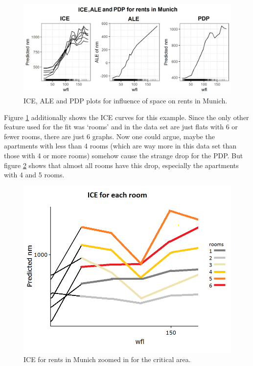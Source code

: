 \documentclass[
]{krantz}
\begin{document}
\begin{figure}
\includegraphics[width=1\linewidth]{images/ale_1_rf_rent_for_rooms_and_wfl_ALE_vs_ICE} \caption{ICE, ALE and PDP plots for influence of space on rents in Munich.}\label{fig:aleIceRents}
\end{figure}



Figure \ref{fig:aleIceRents} additionally shows the ICE curves for this example. Since the only other feature used for the fit was `rooms' and in the data set are just flats with 6 or fewer rooms, there are just 6 graphs. Now one could argue, maybe the apartments with less than 4 rooms (which are way more in this data set than those with 4 or more rooms) somehow cause the strange drop for the PDP. But figure \ref{fig:iceZoomedRents} shows that almost all rooms have this drop, especially the apartments with 4 and 5 rooms.

\begin{figure}
\includegraphics[width=1\linewidth]{images/ale_1_ice_zoomed} \caption{ICE for rents in Munich zoomed in for the critical area.}\label{fig:iceZoomedRents}
\end{figure}
\end{document}
